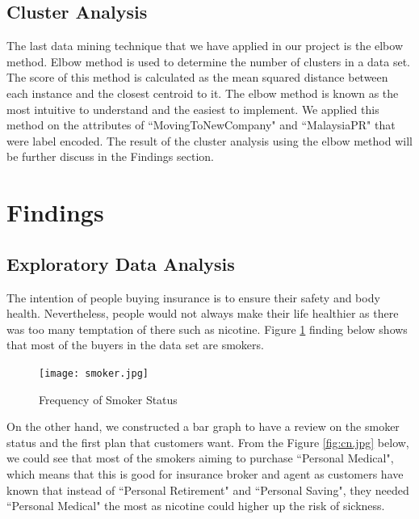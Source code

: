 \documentclass[11pt]{article}
\begin{document}
\subsection{Cluster Analysis}
\hspace{0.5cm}The last data mining technique that we have applied in our project is the elbow method. Elbow method is used to determine the number of clusters in a data set. The score of this method is calculated as the mean squared distance between each instance and the closest centroid to it. The elbow method is known as the most intuitive to understand and the easiest to implement. We applied this method on the attributes of ``MovingToNewCompany" and ``MalaysiaPR" that were label encoded. The result of the cluster analysis using the elbow method will be further discuss in the Findings section. 

\section{Findings}

\subsection{Exploratory Data Analysis}
\hspace{0.5cm} The intention of people buying insurance is to ensure their safety and body health. Nevertheless, people would not always make their life healthier as there was too many temptation of there such as nicotine. Figure \ref{fig:smoker.jpg} finding below shows that most of the buyers in the data set are smokers. \vspace{0.3cm}

 \begin{figure}[H]
     \centering
     \texttt{[image: smoker.jpg]}
     \caption{Frequency of Smoker Status}
     \label{fig:smoker.jpg}
 \end{figure}
 
\hspace{0.5cm} On the other hand, we constructed a bar graph to have a review on the smoker status and the first plan that customers want. From the Figure \ref{fig:cn.jpg} below, we could see that most of the smokers aiming to purchase ``Personal Medical", which means that this is good for insurance broker and agent as customers have known that instead of ``Personal Retirement" and ``Personal Saving", they needed ``Personal Medical" the most as nicotine could higher up the risk of sickness. \vspace{0.3cm}
\end{document}
